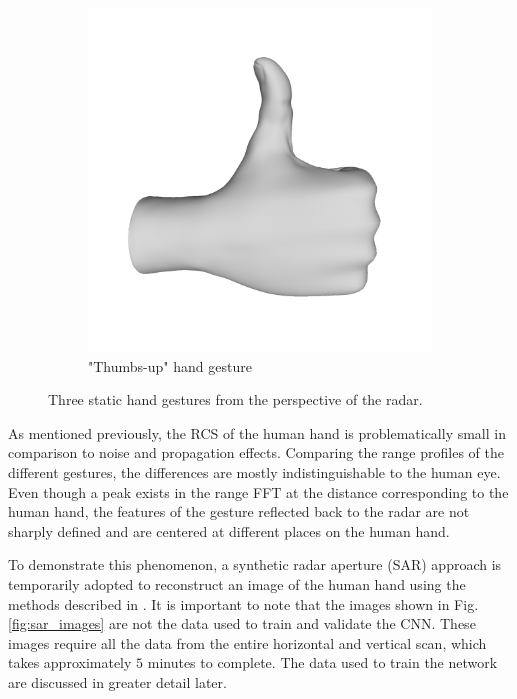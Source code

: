 \documentclass{ieeeaccess}
\begin{document}
\begin{figure}
\begin{subfigure}[b]{0.23\textwidth}
         \includegraphics[width=\textwidth]{tu3D.png}
         \caption{"Thumbs-up" hand gesture}
         \label{fig:tu}
     \end{subfigure}
        \caption{Three static hand gestures from the perspective of the radar.}
        \label{fig:hand_gestures}
\end{figure}

As mentioned previously, the RCS of the human hand is problematically small in comparison to noise and propagation effects. Comparing the range profiles of the different gestures, the differences are mostly indistinguishable to the human eye. Even though a peak exists in the range FFT at the distance corresponding to the human hand, the features of the gesture reflected back to the radar are not sharply defined and are centered at different places on the human hand. 

To demonstrate this phenomenon, a synthetic radar aperture (SAR) approach is temporarily adopted to reconstruct an image of the human hand using the methods described in \cite{muhammet:testbeds,Sheen:NearField3DRadarImaging}. It is important to note that the images shown in Fig. \ref{fig:sar_images} are not the data used to train and validate the CNN. These images require all the data from the entire horizontal and vertical scan, which takes approximately $5$ minutes to complete. The data used to train the network are discussed in greater detail later. 
\end{document}
